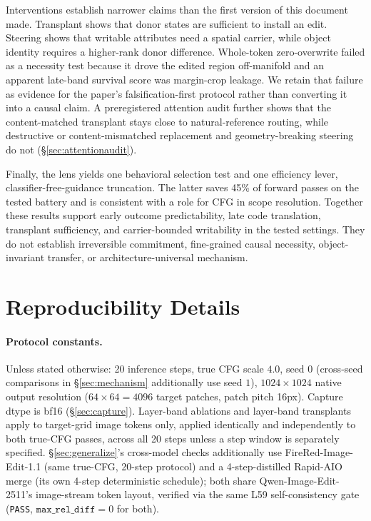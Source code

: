 \documentclass[10pt,twocolumn,letterpaper]{article}
\newcommand{\model}{Qwen-Image-Edit-2511}
\begin{document}
Interventions establish narrower claims than the first version of this
document made. Transplant shows that donor states are sufficient to
install an edit. Steering shows that writable attributes need a spatial
carrier, while object identity requires a higher-rank donor difference.
Whole-token zero-overwrite failed as a necessity test because it drove
the edited region off-manifold and an apparent late-band survival score
was margin-crop leakage. We retain that failure as evidence for the
paper's falsification-first protocol rather than converting it into a
causal claim. A preregistered attention audit further shows that the
content-matched transplant stays close to natural-reference routing, while
destructive or content-mismatched replacement and geometry-breaking steering
do not (\S\ref{sec:attentionaudit}).

Finally, the lens yields one behavioral selection test and one efficiency
lever, classifier-free-guidance truncation. The latter saves 45\%
of forward passes on the tested battery and is consistent with a role for
CFG in scope resolution. Together these results support early outcome
predictability, late code translation, transplant sufficiency, and
carrier-bounded writability in the tested settings. They do not establish
irreversible commitment, fine-grained causal necessity, object-invariant
transfer, or architecture-universal mechanism.




\appendix
\section{Reproducibility Details}\label{app:repro}

\paragraph{Protocol constants.} Unless stated otherwise: 20 inference
steps, true CFG scale $4.0$, seed $0$ (cross-seed comparisons in
\S\ref{sec:mechanism} additionally use seed $1$), $1024\times1024$
native output resolution ($64\times64{=}4096$ target patches, patch
pitch 16px). Capture dtype is bf16 (\S\ref{sec:capture}). Layer-band
ablations and layer-band transplants apply to target-grid image tokens
only, applied identically and independently to both true-CFG passes,
across all 20 steps unless a step window is separately specified.
\S\ref{sec:generalize}'s cross-model checks additionally use
FireRed-Image-Edit-1.1 (same true-CFG, 20-step protocol) and a
4-step-distilled Rapid-AIO merge (its own 4-step deterministic schedule);
both share \model{}'s image-stream token layout, verified via the same
L59 self-consistency gate (\texttt{PASS}, $\texttt{max\_rel\_diff}=0$ for
both).
\end{document}
